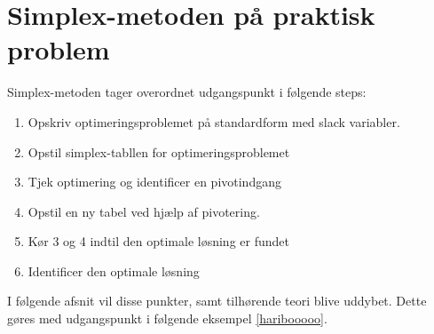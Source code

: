 \section{Simplex-metoden på praktisk problem}
Simplex-metoden tager overordnet udgangspunkt i følgende steps: 
%
\begin{col}{}{}
%
\begin{enumerate}
\item Opskriv optimeringsproblemet på standardform med slack variabler.  %
\item Opstil simplex-tabllen for optimeringsproblemet					 %
\item Tjek optimering og identificer en pivotindgang					 %
\item Opstil en ny tabel ved hjælp af pivotering. 						 %
\item Kør 3 og 4 indtil den optimale løsning er fundet 					 %
\item Identificer den optimale løsning									 %
\end{enumerate}
%
\end{col}
\noindent
%
I følgende afsnit vil disse punkter, samt tilhørende teori blive uddybet. 
Dette gøres med udgangspunkt i følgende eksempel \ref{haribooooo}.
%
\\
%
